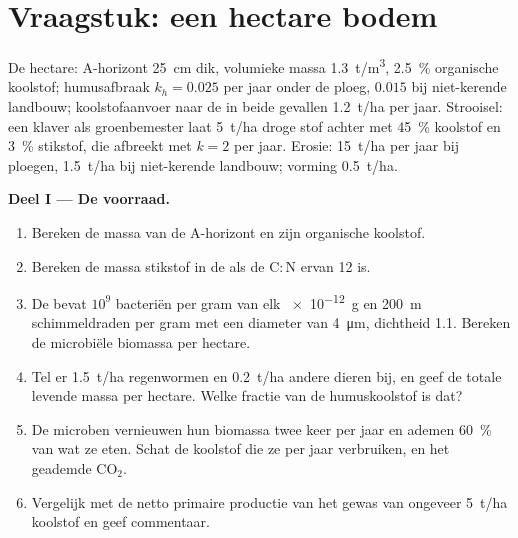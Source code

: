 \section{Vraagstuk: een hectare bodem}

\begin{problem}
\label{pb:b2:living-soil:1}
De hectare: A-horizont \qty{25}{cm} dik, volumieke massa
\qty{1.3}{t/m^3}, \qty{2.5}{\%} organische koolstof; humusafbraak $k_h =
0.025$ per jaar onder de ploeg, $0.015$ bij niet-kerende landbouw; koolstofaanvoer
naar de  in beide gevallen \qty{1.2}{t/ha} per jaar. Strooisel: een
klaver als groenbemester laat \qty{5}{t/ha} droge stof achter met
\qty{45}{\%} koolstof en \qty{3}{\%} stikstof, die afbreekt met $k = 2$
per jaar. Erosie: \qty{15}{t/ha} per jaar bij ploegen, \qty{1.5}{t/ha}
bij niet-kerende landbouw; vorming \qty{0.5}{t/ha}.

\medskip
\noindent\textbf{Deel I --- De voorraad.}
\begin{enumerate}
  \item Bereken de massa van de A-horizont en zijn organische koolstof.
  \item Bereken de massa stikstof in de  als de
        $\mathrm{C:N}$ ervan 12 is.
  \item De  bevat $10^{9}$ bacteriën per gram van elk \qty{e-12}{g}
        en \qty{200}{m} schimmeldraden per gram met een diameter van
        \qty{4}{\micro m}, dichtheid 1.1. Bereken de microbiële biomassa per
        hectare.
  \item Tel er \qty{1.5}{t/ha} regenwormen en \qty{0.2}{t/ha}
        andere dieren bij, en geef de totale levende massa per hectare.
        Welke fractie van de humuskoolstof is dat?
  \item De microben vernieuwen hun biomassa twee keer per jaar en ademen
        \qty{60}{\%} van wat ze eten. Schat de koolstof die ze per jaar
        verbruiken, en het geademde $\mathrm{CO_2}$.
  \item Vergelijk met de netto primaire productie van het gewas van ongeveer
        \qty{5}{t/ha} koolstof en geef commentaar.
\end{enumerate}


\end{problem}
